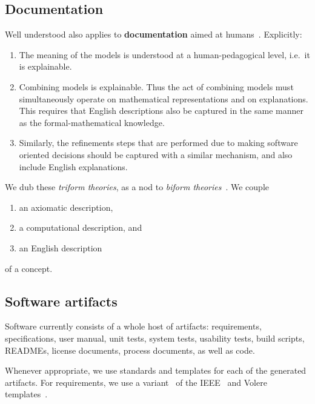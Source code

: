 \documentclass[a4paper,UKenglish,cleveref,autoref,thm-restate]{oasics-v2021}
\begin{document}
\subsection{Documentation}
\label{subsec:documentation}

Well understood also applies to \textbf{documentation} aimed
at humans~\cite{parnas2011precise}. Explicitly:
\begin{enumerate}
\item The meaning of the models is understood at a human-pedagogical level,
i.e.\ it is explainable.
\item Combining models is explainable. Thus the act of combining models
must simultaneously
operate on mathematical representations and on explanations. This requires that
English descriptions also be captured in the same manner as the
formal-mathematical knowledge.
\item Similarly, the refinements steps that are performed due to making software
oriented decisions should be captured with a similar mechanism, and also include
English explanations.
\end{enumerate}

We dub these \emph{triform theories}, as a nod to \emph{biform
theories}~\cite{Farmer2007}. We couple 
\begin{enumerate} %
\item an axiomatic description,
\item a computational description, and
\item an English description
\end{enumerate}
of a concept.

\subsection{Software artifacts}
\label{subsec:software-artifacts}

Software currently consists of a whole host of artifacts: requirements,
specifications, user manual, unit tests, system tests, usability tests, build
scripts, READMEs, license documents, process documents, as well as code.

Whenever appropriate, we use standards and templates for each of the generated
artifacts. For requirements, we use a variant~\cite{SmithEtAl2007}
of the IEEE~\cite{IEEE1998} and Volere
templates~\cite{RobertsonAndRobertson1999Vol}.
\end{document}

